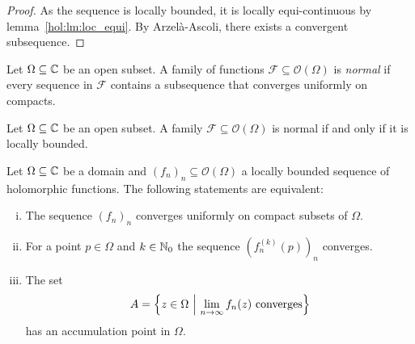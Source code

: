 \begin{proof}
As the sequence is locally bounded, it is locally equi-continuous
by lemma~\ref{hol:lm:loc_equi}. By Arzelà-Ascoli, there exists a
convergent subsequence.
\end{proof}

\begin{definicija}
Let $\Omega \subseteq \mathbb{C}$ be an open subset. A family of functions
$\mathcal{F} \subseteq \mathcal{O}(\Omega)$ is
\emph{normal} if every sequence in
$\mathcal{F}$ contains a subsequence that converges uniformly on
compacts.
\end{definicija}

\begin{izrek}[Montel]
Let $\Omega \subseteq \mathbb{C}$ be an open subset. A family
$\mathcal{F} \subseteq \mathcal{O}(\Omega)$ is normal if and only
if it is locally bounded.
\end{izrek}

\obvs


\begin{izrek}[Vitali]
Let $\Omega \subseteq \mathbb{C}$ be a domain and
$(f_n)_n \subseteq \mathcal{O}(\Omega)$ a locally bounded sequence
of holomorphic functions. The following statements are equivalent:

\begin{enumerate}[i)]
\item The sequence $(f_n)_n$ converges uniformly on compact subsets
of $\Omega$.
\item For a point $p \in \Omega$ and $k \in \mathbb{N}_0$ the sequence
$(f_n^{(k)}(p))_n$ converges.
\item The set
\[
A =
\left\{z \in \Omega~\middle\vert~\lim_{n \to \infty} f_n(z)~\text{converges}\right\}
\]
has an accumulation point in $\Omega$.
\end{enumerate}
\end{izrek}

